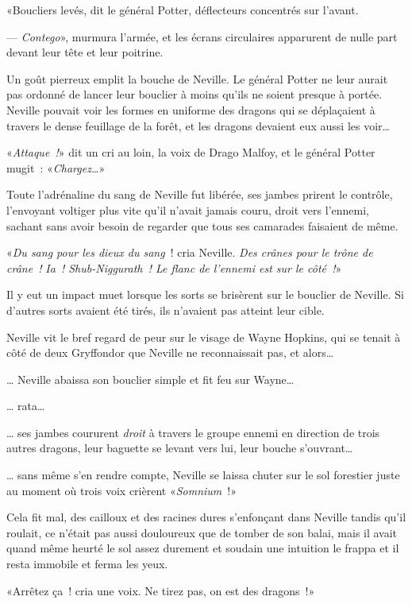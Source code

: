 «Boucliers levés, dit le général Potter, déflecteurs concentrés sur l'avant.

--- \emph{Contego}», murmura l'armée, et les écrans circulaires apparurent de nulle part devant leur tête et leur poitrine.

Un goût pierreux emplit la bouche de Neville. Le général Potter ne leur aurait pas ordonné de lancer leur bouclier à moins qu'ils ne soient presque à portée. Neville pouvait voir les formes en uniforme des dragons qui se déplaçaient à travers le dense feuillage de la forêt, et les dragons devaient eux aussi les voir…

«\emph{Attaque~!}» dit un cri au loin, la voix de Drago Malfoy, et le général Potter mugit~: «\emph{Chargez…}»

Toute l'adrénaline du sang de Neville fut libérée, ses jambes prirent le contrôle, l'envoyant voltiger plus vite qu'il n'avait jamais couru, droit vers l'ennemi, sachant sans avoir besoin de regarder que tous ses camarades faisaient de même.

«\emph{Du sang pour les dieux du sang}~! cria Neville. \emph{Des crânes pour le trône de crâne~!} \emph{Ia~! Shub-Niggurath~! Le flanc de l'ennemi est sur le côté~!}»

Il y eut un impact muet lorsque les sorts se brisèrent sur le bouclier de Neville. Si d'autres sorts avaient été tirés, ils n'avaient pas atteint leur cible.

Neville vit le bref regard de peur sur le visage de Wayne Hopkins, qui se tenait à côté de deux Gryffondor que Neville ne reconnaissait pas, et alors…

… Neville abaissa son bouclier simple et fit feu sur Wayne…

… rata…

… ses jambes coururent \emph{droit} à travers le groupe ennemi en direction de trois autres dragons, leur baguette se levant vers lui, leur bouche s'ouvrant…

… sans même s'en rendre compte, Neville se laissa chuter sur le sol forestier juste au moment où trois voix crièrent «\emph{Somnium}~!»

Cela fit mal, des cailloux et des racines dures s'enfonçant dans Neville tandis qu'il roulait, ce n'était pas aussi douloureux que de tomber de son balai, mais il avait quand même heurté le sol assez durement et soudain une intuition le frappa et il resta immobile et ferma les yeux.

«Arrêtez ça~! cria une voix. Ne tirez pas, on est des dragons~!»

